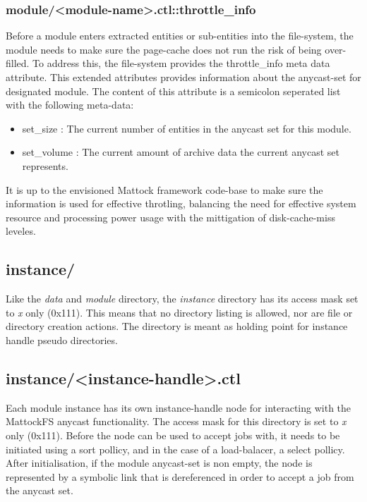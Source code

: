\subsubsection{module/<module-name>.ctl::throttle\_info}
Before a module enters extracted entities or sub-entities into the file-system, the module needs to make sure the page-cache does not run the risk of being over-filled. To address this, the file-system provides the throttle\_info meta data attribute. This extended attributes provides information about the anycast-set for designated module. The content of this attribute is a semicolon seperated list with the following meta-data:
\begin{itemize}
\item set\_size : The current number of entities in the anycast set for this module.
\item set\_volume : The current amount of archive data the current anycast set represents.
\end{itemize}
It is up to the envisioned Mattock framework code-base to make sure the information is used for effective throtling, balancing the need for effective system resource and processing power usage with the mittigation of disk-cache-miss leveles.
\subsection{instance/}
Like the \emph{data} and \emph{module} directory, the \emph{instance} directory  has its access mask set to \emph{x} only (0x111). This means that no directory listing is allowed, nor are file or directory creation actions. The directory is meant as holding point for instance handle pseudo directories.
\subsection{instance/<instance-handle>.ctl}
Each module instance has its own instance-handle node for interacting with the MattockFS anycast functionality. The  access mask for this directory is set to \emph{x} only (0x111). Before the node can be used to accept jobs with, it needs to be initiated using a sort pollicy, and in the case of a load-balacer, a select pollicy. After initialisation, if the module anycast-set is non empty, the node is represented by a symbolic link that is dereferenced in order to accept a job from the anycast set.
